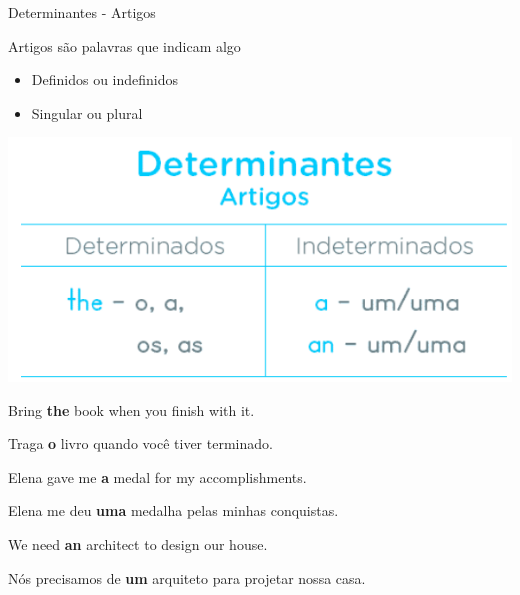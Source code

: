 \documentclass[compress,mathserif,xcolor=table]{beamer}
\begin{document}
\begin{frame}{Determinantes - Artigos}

\begin{minipage}{.54\textwidth}
Artigos são palavras que indicam algo
\begin{itemize}
    \item Definidos ou indefinidos
    \item Singular ou plural
\end{itemize}
\end{minipage}
\begin{minipage}{.44\textwidth}
\includegraphics[width=\linewidth]{images/determinantes_artigos.png}
\end{minipage}

\vspace{0.5cm}

Bring \textbf{the} book when you finish with it.

Traga \textbf{o} livro quando você tiver terminado.

\vspace{0.2cm}

Elena gave me \textbf{a} medal for my accomplishments.

Elena me deu \textbf{uma} medalha pelas minhas conquistas.

\vspace{0.2cm}

We need \textbf{an} architect to design our house.

Nós precisamos de \textbf{um} arquiteto para projetar nossa casa.

\end{frame}

\end{document}
